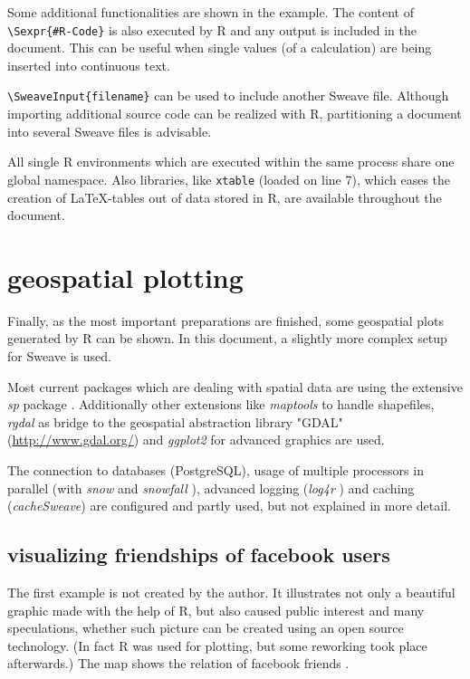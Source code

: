 \documentclass{ifacconf}
\begin{document}
Some additional functionalities are shown in the example. The content of
\texttt{\textbackslash{}Sexpr\{\#R-Code\}}
is also executed by R and any output is included in the document. This can be
useful when single values (of a calculation) are being inserted into continuous text.

\texttt{\textbackslash{}SweaveInput\{filename\}} can be used to include 
another Sweave file. Although importing additional source code can be realized with
R, partitioning a document into several Sweave files is advisable.

All single R environments which are executed within the same process share one
global namespace. Also libraries, like \texttt{xtable} (loaded on line 7), which eases the
creation of \LaTeX-tables out of data stored in R, are
available throughout the document.




\section{geospatial plotting}

Finally, as the most important preparations are finished, some geospatial plots 
generated by R can be shown. In this document, a slightly more complex
setup for Sweave is used. 

Most current packages which are dealing with spatial data are using the
extensive \textit{sp} package \citep{RSpatialDataAnalysis}. Additionally
other extensions like \textit{maptools} to handle shapefiles, \textit{rgdal}
as bridge to the geospatial abstraction library "GDAL" (\url{http://www.gdal.org/})
and \textit{ggplot2} \citep{Rggplot2} for advanced graphics are used.

The connection to databases (PostgreSQL), usage of multiple processors 
in parallel (with \textit{snow} and \textit{snowfall} \citep{Rsnow, Rsnowfall}), 
advanced logging (\textit{log4r} \citep{Rlog4r}) and caching (\textit{cacheSweave}) 
are configured and partly used, but not explained in more detail.

\subsection{visualizing friendships of facebook users}
The first example is not created by the author. It illustrates not only a
beautiful graphic made with the help of R, but also caused
public interest and many speculations, whether such picture can be
created using an open source technology. (In fact R was used for plotting,
but some reworking took place afterwards.) The map shows the relation of 
facebook friends \citep{FacebookFriendMap}.
\end{document}
